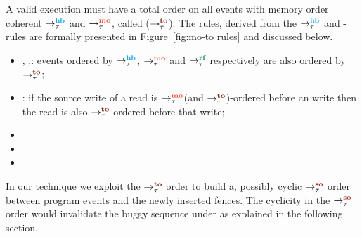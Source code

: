 A valid \cc execution must have a total order on all events with memory
order \sc coherent \wrt $\setHB$ and $\setMO$, called  
($\setTO$).
%
The \lto rules, derived from the $\setHB$ and \lmo-rules are formally presented in 
Figure~\ref{fig:mo-to rules} and discussed below.

\begin{itemize}
	\item {}, ,: events ordered by $\setHB$, $\setMO$
						and $\setRF$ respectively are also ordered by $\setTO$;
	\item {}: if the source write of a \sc read is $\setMO$(and $\setTO$)-ordered 
						before an \sc write then the read is also $\setTO$-ordered
						before that write;
	\item {}
	\item {}
	\item {}
\end{itemize}

In our technique we exploit the $\setTO$ order to build a, possibly cyclic
$\setSO$ order between program events and the newly inserted fences.
The cyclicity in the $\setSO$ order would invalidate the buggy sequence
under \cc as explained in the following section.